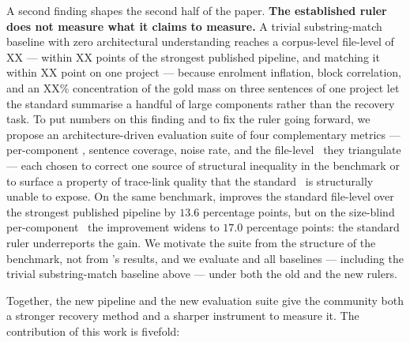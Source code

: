 A second finding shapes the second half of the paper.
\textbf{The established ruler does not measure what it claims to measure.}
A trivial substring-match baseline with zero architectural understanding reaches a corpus-level file-level \fone of XX --- within XX points of the strongest published pipeline, and matching it within XX point on one project --- because enrolment inflation, block correlation, and an XX\% concentration of the gold mass on three sentences of one project let the standard \fone summarise a handful of large components rather than the recovery task.
To put numbers on this finding and to fix the ruler going forward, we propose an architecture-driven evaluation suite of four complementary metrics --- per-component \fone, sentence coverage, noise rate, and the file-level \fone\ they triangulate --- each chosen to correct one source of structural inequality in the benchmark or to surface a property of trace-link quality that the standard \fone\ is structurally unable to expose.
On the same benchmark, \approach improves the standard file-level \fone over the strongest published pipeline by $13.6$ percentage points, but on the size-blind per-component \fone\ the improvement widens to $17.0$ percentage points: the standard ruler underreports the gain.
We motivate the suite from the structure of the benchmark, not from \approach's results, and we evaluate \approach and all baselines --- including the trivial substring-match baseline above --- under both the old and the new rulers.

Together, the new pipeline and the new evaluation suite give the community both a stronger recovery method and a sharper instrument to measure it.
The contribution of this work is fivefold:


